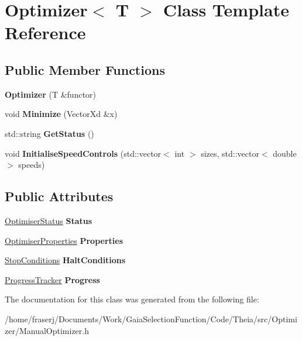 \hypertarget{classOptimizer}{}\section{Optimizer$<$ T $>$ Class Template Reference}
\label{classOptimizer}
\subsection*{Public Member Functions}
\begin{DoxyCompactItemize}
\item 
\mbox{\label{classOptimizer_ac0e9c13ba2d8779c27dcf1dee8ab0306}} 
{\bfseries Optimizer} (T \&functor)
\item 
\mbox{\label{classOptimizer_a1a87a01f13187f0aa30e5fbed82746d4}} 
void {\bfseries Minimize} (Vector\+Xd \&x)
\item 
\mbox{\label{classOptimizer_a9bd0631315cd436b781b13a893b43570}} 
std\+::string {\bfseries Get\+Status} ()
\item 
\mbox{\label{classOptimizer_a5764da74cea367e4fcfb109457775925}} 
void {\bfseries Initialise\+Speed\+Controls} (std\+::vector$<$ int $>$ sizes, std\+::vector$<$ double $>$ speeds)
\end{DoxyCompactItemize}
\subsection*{Public Attributes}
\begin{DoxyCompactItemize}
\item 
\mbox{\label{classOptimizer_abe6112b42cbdc2d21d357eca8e6cddcf}} 
\hyperlink{structOptimiserStatus}{Optimiser\+Status} {\bfseries Status}
\item 
\mbox{\label{classOptimizer_a21a7d8f0ee189158efb5a5c45844b671}} 
\hyperlink{structOptimiserProperties}{Optimiser\+Properties} {\bfseries Properties}
\item 
\mbox{\label{classOptimizer_af7371734bfa497aeef60185738d89a8e}} 
\hyperlink{structStopConditions}{Stop\+Conditions} {\bfseries Halt\+Conditions}
\item 
\mbox{\label{classOptimizer_aecc0f0b358ac630cc78fc40a3d737b53}} 
\hyperlink{structProgressTracker}{Progress\+Tracker} {\bfseries Progress}
\end{DoxyCompactItemize}


The documentation for this class was generated from the following file\+:\begin{DoxyCompactItemize}
\item 
/home/fraserj/\+Documents/\+Work/\+Gaia\+Selection\+Function/\+Code/\+Theia/src/\+Optimizer/Manual\+Optimizer.\+h\end{DoxyCompactItemize}
